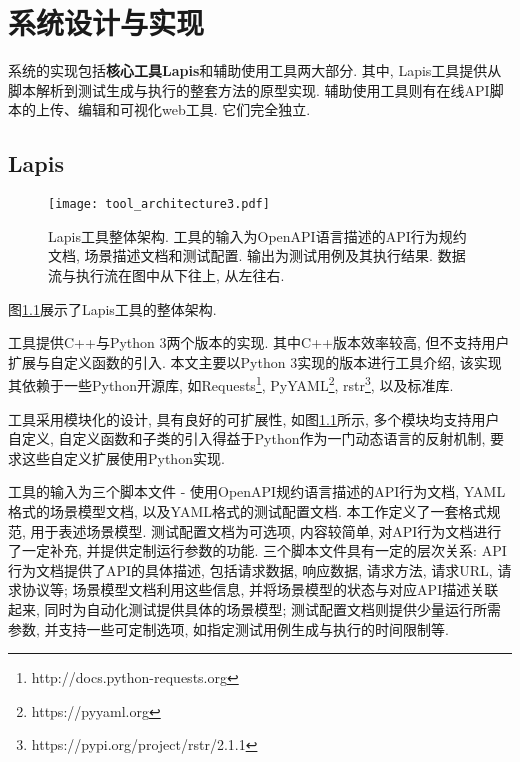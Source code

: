 \chapter{系统设计与实现}

    系统的实现包括\textbf{核心工具Lapis}和辅助使用工具两大部分. 其中, Lapis工具提供从脚本解析到测试生成与执行的整套方法的原型实现. 辅助使用工具则有在线API脚本的上传、编辑和可视化web工具. 它们完全独立.


	\section{Lapis}
	
	    \begin{figure}[!htb]
	        \centering
	        \texttt{[image: tool\_architecture3.pdf]}
	        \caption[Lapis工具整体架构]{Lapis工具整体架构. 工具的输入为OpenAPI语言描述的API行为规约文档, 场景描述文档和测试配置. 输出为测试用例及其执行结果. 数据流与执行流在图中从下往上, 从左往右.}
	        \label{fig:lapis_arch}
	    \end{figure}
	    
	    \label{sec:lapis_impl}
	    
	    图\ref{fig:lapis_arch}展示了Lapis工具的整体架构.
	    
	    工具提供C++与Python 3两个版本的实现. 其中C++版本效率较高, 但不支持用户扩展与自定义函数的引入. 本文主要以Python 3实现的版本进行工具介绍, 该实现其依赖于一些Python开源库, 如Requests\footnote{http://docs.python-requests.org}, PyYAML\footnote{https://pyyaml.org}, rstr\footnote{https://pypi.org/project/rstr/2.1.1}, 以及标准库.
	    
	    工具采用模块化的设计, 具有良好的可扩展性, 如图\ref{fig:lapis_arch}所示, 多个模块均支持用户自定义, 自定义函数和子类的引入得益于Python作为一门动态语言的反射机制, 要求这些自定义扩展使用Python实现.
	    
	    工具的输入为三个脚本文件 - 使用OpenAPI规约语言描述的API行为文档, YAML格式的场景模型文档, 以及YAML格式的测试配置文档. 本工作定义了一套格式规范, 用于表述场景模型. 测试配置文档为可选项, 内容较简单, 对API行为文档进行了一定补充, 并提供定制运行参数的功能. 三个脚本文件具有一定的层次关系: API行为文档提供了API的具体描述, 包括请求数据, 响应数据, 请求方法, 请求URL, 请求协议等; 场景模型文档利用这些信息, 并将场景模型的状态与对应API描述关联起来, 同时为自动化测试提供具体的场景模型; 测试配置文档则提供少量运行所需参数, 并支持一些可定制选项, 如指定测试用例生成与执行的时间限制等.
	    
